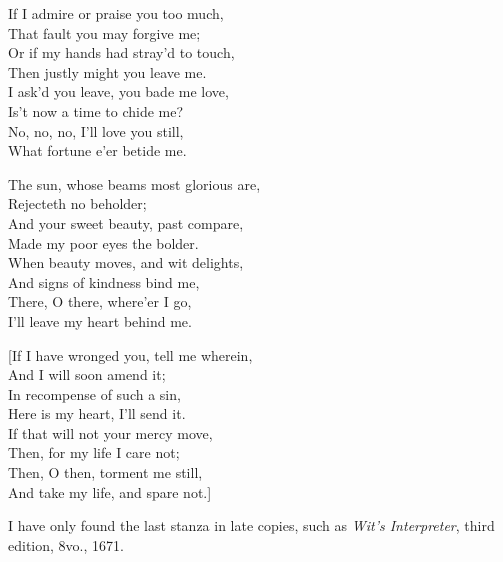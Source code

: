 

\settowidth{\versewidth}{And your sweet beauty, past compare,}
\begin{dcverse}\begin{altverse}
If I admire or praise you too much,\\
That fault you may forgive me;\\
Or if my hands had stray’d to touch,\\
Then justly might you leave me.\\
I ask'd you leave, you bade me love,\\
Is’t now a time to chide me?\\
No, no, no, I’ll love you still,\\
What fortune e’er betide me.
\end{altverse}

\begin{altverse}
The sun, whose beams most glorious are,\\
Rejecteth no beholder;\\
And your sweet beauty, past compare,\\
Made my poor eyes the bolder.\\
When beauty moves, and wit delights,\\
And signs of kindness bind me,\\
There, O there, where’er I go,\\
I’ll leave my heart behind me.
\end{altverse}

\begin{altverse}
{[}If I have wronged you, tell me wherein,\\
And I will soon amend it;\\
In recompense of such a sin,\\
Here is my heart, I’ll send it.\\
If that will not your mercy move,\\
Then, for my life I care not;\\
Then, O then, torment me still,\\
And take my life, and spare not.{]}
\end{altverse}
\end{dcverse}

I have only found the last stanza in late copies, such as \textit{Wit's Interpreter},
third edition, 8vo., 1671.
\pagebreak

